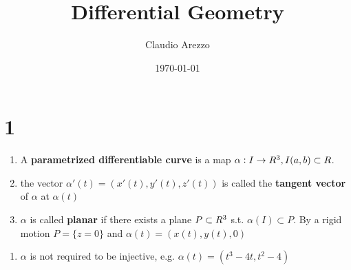 \documentclass[11pt]{article}
\author{Claudio Arezzo}
\date{\today}
\title{Differential Geometry}
\begin{document}
\maketitle \clearpage
\tableofcontents \clearpage\section{1}
\label{sec:org4799da3}
\begin{definition}[]
\begin{enumerate}
\item A \textbf{parametrized differentiable curve}  is a map
\(\alpha:I\to\relax{R}^3,I(a,b)\subset \relax{R}\).
\item the vector  \(\alpha'(t)=(x'(t),y'(t),z'(t))\) is called the 
\textbf{tangent vector} of \(\alpha\) at \(\alpha(t)\)
\item \(\alpha\) is called \textbf{planar} if there exists a plane \(P\subset \relax{R}^3\)  s.t. 
\(\alpha(I)\subset P\). By a rigid motion \(P=\{z=0\}\) and 
\(\alpha(t)=(x(t),y(t),0)\)
\end{enumerate}
\end{definition}

\begin{enumerate}
\item \(\alpha\) is not required to be injective, e.g. \(\alpha(t)=(t^3-4t,t^2-4)\)
  \begin{center}
  \end{center}
\end{enumerate}
\end{document}
